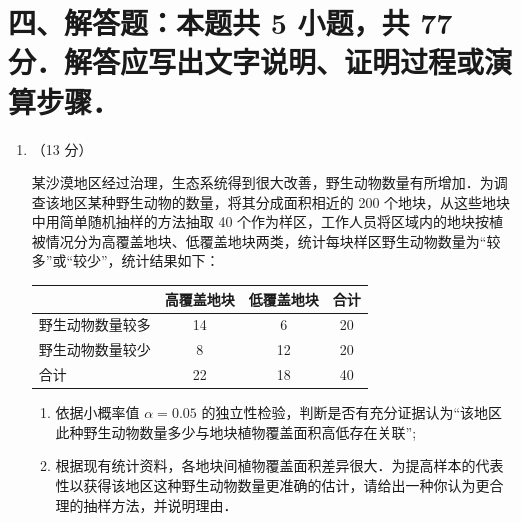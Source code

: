 \documentclass[a4paper,12pt]{ctexart}
\begin{document}
\section*{四、解答题：本题共 5 小题，共 77 分．解答应写出文字说明、证明过程或演算步骤．}

\begin{enumerate}[leftmargin=2em,itemsep=6pt,resume]

\item （13 分）

某沙漠地区经过治理，生态系统得到很大改善，野生动物数量有所增加．为调查该地区某种野生动物的数量，将其分成面积相近的 200 个地块，从这些地块中用简单随机抽样的方法抽取 40 个作为样区，工作人员将区域内的地块按植被情况分为高覆盖地块、低覆盖地块两类，统计每块样区野生动物数量为``较多''或``较少''，统计结果如下：

\vspace{4pt}
\begin{center}
\begin{tabular}{lccc}
\toprule
& 高覆盖地块 & 低覆盖地块 & 合计 \\
\midrule
野生动物数量较多 & 14 &  6 & 20 \\
野生动物数量较少 &  8 & 12 & 20 \\
\midrule
合计 & 22 & 18 & 40 \\
\bottomrule
\end{tabular}
\end{center}

\begin{enumerate}[label=(\arabic*),leftmargin=3em,itemsep=3pt]
  \item 依据小概率值 $\alpha = 0.05$ 的独立性检验，判断是否有充分证据认为``该地区此种野生动物数量多少与地块植物覆盖面积高低存在关联'';
  \item 根据现有统计资料，各地块间植物覆盖面积差异很大．为提高样本的代表性以获得该地区这种野生动物数量更准确的估计，请给出一种你认为更合理的抽样方法，并说明理由．
\end{enumerate}

\vspace{6pt}
\begin{center}


\end{center}
\end{enumerate}
\end{document}
